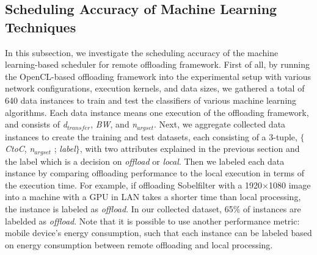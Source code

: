 \documentclass[10pt, conference, compsocconf]{IEEEtran}
\begin{document}
\subsection{Scheduling Accuracy of Machine Learning Techniques}
In this subsection, we investigate the scheduling accuracy of the
machine learning-based scheduler for remote offloading framework.
%
First of all, by running the OpenCL-based offloading framework into
the experimental setup with various network configurations, execution
kernels, and data sizes, we gathered a total of 640 data instances to train 
and test the classifiers of various machine learning algorithms.
%
Each data instance means one execution of the offloading framework, and
consists of \textit{d$_{transfer}$}, \textit{BW}, and
\textit{n$_{argset}$}.
%
Next, we aggregate collected data instances to create the
training and test datasets, each consisting of a 3-tuple, $\{$\textit{CtoC},
\textit{n$_{argset}$} ; \textit{label}$\}$, with two attributes explained 
in the previous section and the label which is a decision on 
\textit{offload} or \textit{local}.
%
Then we labeled each data instance by comparing offloading 
performance to the local execution in terms of the execution time.
%
For example, if offloading Sobelfilter with a 1920$\times$1080 image
into a machine with a GPU in LAN takes a shorter time than
local processing, the instance is labeled as \textit{offload}.
%
In our collected dataset, 65\% of instances are labelded as
\textit{offload}.
%
Note that it is possible to use another performance metric: mobile
device's energy consumption, such that each instance can be labeled
based on energy consumption between remote offloading and local
processing.
%
%
%
%
%
\end{document}

